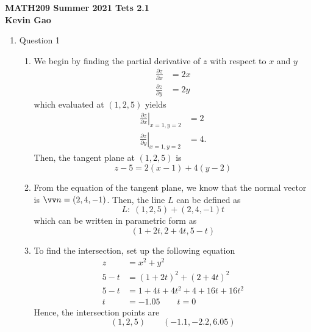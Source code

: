 \documentclass[11pt]{article}
\newcommand{\partialderiv}[2] {\frac{\partial #1}{\partial #2}}
\begin{document}
\begin{center}

{\bf \Large \bf MATH209 Summer 2021 Tets 2.1}\\
{\bf \large Kevin Gao}
\end{center}

\begin{enumerate}
    \item Question 1
    \begin{enumerate}
        \item
        We begin by finding the partial derivative of $z$ with respect to $x$ and $y$
        $$
        \begin{aligned}
        \partialderiv{z}{x} &= 2x \\
        \partialderiv{z}{y} &= 2y
        \end{aligned}
        $$
        which evaluated at $(1,2,5)$ yields
        $$
        \begin{aligned}
        \left. \partialderiv{z}{x} \right\vert_{x=1,y=2} &= 2 \\
        \left. \partialderiv{z}{y} \right\vert_{x=1,y=2} &= 4.
        \end{aligned}
        $$
        Then, the tangent plane at $(1,2,5)$ is
        $$
        z - 5 = 2(x-1) + 4(y-2)
        $$
        
        \item
        From the equation of the tangent plane, we know that the normal vector is $\vv n = (2,4,-1)$. Then, the line $L$ can be defined as
        $$
        L:\; (1,2,5) + (2,4,-1)t
        $$
        which can be written in parametric form as
        $$
        (1+2t, 2+4t, 5-t)
        $$
        
        \item To find the intersection, set up the following equation
        $$
        \begin{aligned}
            z &= x^2 + y^2 \\
            5-t &= (1+2t)^2 + (2+4t)^2 \\
            5-t &= 1+4t + 4t^2 + 4 + 16t+ 16t^2 \\
            t &= -1.05 \qquad t = 0
        \end{aligned}
        $$
        Hence, the intersection points are
        $$
        (1,2,5) \qquad (-1.1, -2.2, 6.05)
        $$
    \end{enumerate}
    

\end{enumerate}
\end{document}
